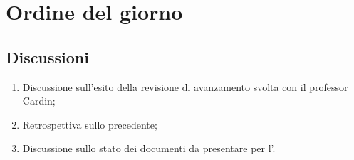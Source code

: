 \section{Ordine del giorno} \label{sec:agenda}
\subsection{Discussioni} \label{subsec:discussione}
\begin{enumerate}
    \item Discussione sull'esito della revisione di avanzamento svolta con il professor Cardin;
    \item Retrospettiva sullo  precedente;
    \item Discussione sullo stato dei documenti da presentare per l’.

    
\end{enumerate}


